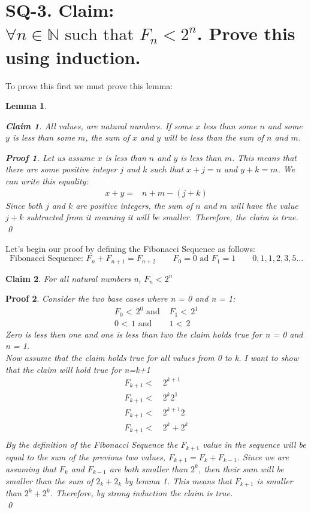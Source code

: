 \documentclass[11pt]{article}
\newtheorem*{claim}{Claim}
\newtheorem{lemma}{Lemma}
\newtheorem*{poof}{Proof}
\begin{document}
\section*{SQ-3. Claim: $\forall n \in \mathbb{N} \text{ such that }F_n < 2^n$. Prove this using induction.}
To prove this first we must prove this lemma:
\begin{lemma}
    \begin{claim}
        All values, are natural numbers. If some $x$ less than some $n$ and some $y$ is less than some $m$, the sum of $x$ and $y$ will be less than the sum of $n$ and $m$.
    \end{claim}
    \begin{poof}
        Let us assume $x$ is less than $n$ and $y$ is less than $m$. This means that there are some positive integer $j$ and $k$ such that $x+j=n$ and $y+k=m$. We can write this equality:
        \begin{align*}
            x+y =& n+m-(j+k)
        \end{align*}
        Since both $j$ and $k$ are positive integers, the sum of $n$ and $m$ will have the value $j+k$ subtracted from it meaning it will be smaller. Therefore, the claim is true.\\
        \qed
    \end{poof}
\end{lemma}
Let's begin our proof by defining the Fibonacci Sequence as follows:
$$\text{Fibonacci Sequence: }F_n+F_{n+1}=F_{n+2}\qquad F_0 = 0 \text{ ad }F_1=1 \qquad 0,1,1,2,3,5...$$
\begin{claim}
    For all natural numbers n, $F_n < 2^n$
\end{claim}
\begin{poof}
    Consider the two base cases where n = 0 and n = 1:
    \begin{align*}
        F_0<\,2^0 \text{ and }& F_1<\,2^1\\
        0<\,1\text{ and }&1<\,2
    \end{align*}
    Zero is less then one and one is less than two the claim holds true for n = 0 and n = 1.
    \\
    \noindent Now assume that the claim holds true for all values from 0 to k. I want to show that the claim will hold true for n=k+1
    \begin{align*}
        F_{k+1}<&\,2^{k+1}\\
        F_{k+1}<&\,2^{k}2^1\\
        F_{k+1}<&\,2^{k+1}2\\
        F_{k+1}<&\,2^{k}+2^{k}\\
    \end{align*}
    By the definition of the Fibonacci Sequence the $F_{k+1}$ value in the sequence will be equal to the sum of the previous two values, $F_{k+1}=F_k+F_{k-1}$. Since we are assuming that $F_k$ and $F_{k-1}$ are both smaller than $2^k$, then their sum will be smaller than the sum of $2_k+2_k$ by lemma 1. This means that $F_{k+1}$ is smaller than $2^k+2^k$. Therefore, by strong induction the claim is true.\\
    \qed
\end{poof}
\end{document}
